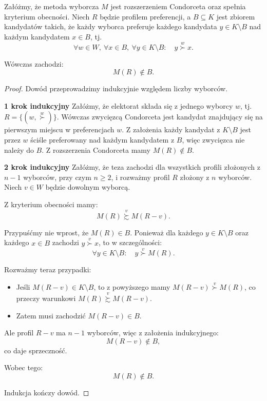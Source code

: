 \documentclass[12pt,a4paper]{mwrep}
\begin{document}
	\begin{lemma}
		\label{lemma:sat_1}
		Załóżmy, że metoda wyborcza \(M\) jest rozszerzeniem Condorceta oraz spełnia kryterium obecności. 
		Niech \(R\) będzie profilem preferencji, a \(B \subseteq K\) jest zbiorem kandydatów takich, że każdy wyborca
		preferuje każdego kandydata \(y \in K \setminus B\) nad każdym kandydatem \(x \in B\), tj.
		\[
		\forall w \in W,\ \forall x \in B,\ \forall y \in K \setminus B:\quad y \overset{w}{\succ} x.
		\]
		
		Wówczas zachodzi:
		\[
		M(R) \notin B.
		\]
	\end{lemma}
	
	\begin{proof}
		Dowód przeprowadzimy indukcyjnie względem liczby wyborców.
		
		\textbf{1 krok indukcyjny} Załóżmy, że elektorat składa się z jednego wyborcy \(w\), tj. \(R=\{(w,\overset{w}{\succ})\}\).	Wówczas zwycięzcą Condorceta jest kandydat znajdujący się na pierwszym miejscu w preferencjach \(w\). Z założenia każdy kandydat z \(K \setminus B\) jest przez \(w\) ściśle preferowany nad każdym kandydatem z \(B\), więc zwycięzca nie należy do \(B\). Z rozszerzenia Condorceta mamy \(M(R)\notin B\).
		
		\textbf{2 krok indukcyjny} Załóżmy, że teza zachodzi dla wszystkich profili złożonych z \(n-1\) wyborców, przy czym \(n \geq 2\), i rozważmy profil \(R\) złożony z \(n\) wyborców. Niech \(v \in W\) będzie dowolnym wyborcą.
		
		Z kryterium obecności mamy:
		\[
		M(R) \overset{v}{\succsim} M(R-v).
		\]
		
		Przypuśćmy nie wprost, że \(M(R) \in B\). Ponieważ dla każdego \(y \in K \setminus B\) oraz każdego \(x \in B\) zachodzi \(y \overset{v}{\succ} x\), to w szczególności:
		\[
		\forall y \in K \setminus B:\quad y \overset{v}{\succ} M(R).
		\]
		
		Rozważmy teraz przypadki:
		
		\begin{itemize}
			\item Jeśli \(M(R-v) \in K \setminus B\), to z powyższego mamy \(M(R-v) \overset{v}{\succ} M(R)\),
			co przeczy warunkowi \(M(R) \overset{v}{\succsim} M(R-v)\).
			
			\item Zatem musi zachodzić \(M(R-v) \in B\).
		\end{itemize}
		
		Ale profil \(R-v\) ma \(n-1\) wyborców, więc z założenia indukcyjnego:
		\[
		M(R-v) \notin B,
		\]
		co daje sprzeczność.
		
		Wobec tego:
		\[
		M(R) \notin B.
		\]
		
		Indukcja kończy dowód.
	\end{proof}
\end{document}
